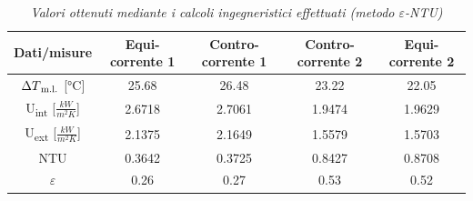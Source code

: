 \documentclass[a4paper,10pt]{article}                                                                                       %
\begin{document}
\begin{table}[H]                                                                                                            %
  \caption{\textit{Valori ottenuti mediante i calcoli ingegneristici effettuati (metodo $\varepsilon$-NTU)}}                %
  \label{tab:eps_ntu_calcs}                                                                                                 %
  \vspace{3mm}                                                                                                              %
  \centering                                                                                                                %
  \begin{tabular}{||c|c|c|c|c||}                                                                                            %
    \hline
    Dati/misure                                 & Equi-corrente 1 & Contro-corrente 1 & Contro-corrente 2 & Equi-corrente 2 \\
    \hline\hline
    $\Delta{T\textsubscript{m.l.}}$ [°C]        & 25.68           & 26.48             & 23.22             & 22.05           \\
    U\textsubscript{int} [$\frac{kW}{m^{2}K}$]  & 2.6718          & 2.7061            & 1.9474            & 1.9629          \\
    U\textsubscript{ext} [$\frac{kW}{m^{2}K}$]  & 2.1375          & 2.1649            & 1.5579            & 1.5703          \\
    NTU                                         & 0.3642          & 0.3725            & 0.8427            & 0.8708          \\
    $\varepsilon$                               & 0.26            & 0.27              & 0.53              & 0.52            \\
    \hline
  \end{tabular}                                                                                                             %
\end{table}                                                                                                                 %
\end{document}
